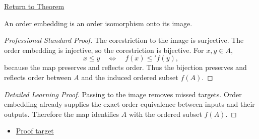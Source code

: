 \newpage
{}
\label{prf:order-embedding-isomorphism-onto-image}

\begin{remark*}[Return]
\hyperref[thm:order-embedding-isomorphism-onto-image]{Return to Theorem}
\end{remark*}

\begin{theorem*}
An order embedding is an order isomorphism onto its image.
\end{theorem*}

\begin{proof}[Professional Standard Proof]
\LRAProofBodyStart
The corestriction to the image is surjective. The order embedding is injective,
so the corestriction is bijective. For $x,y\in A$,
\[
x\leq y \quad\Longleftrightarrow\quad f(x)\leq' f(y),
\]
because the map preserves and reflects order. Thus the bijection preserves
and reflects order between $A$ and the induced ordered subset $f(A)$.
\end{proof}

\begin{proof}[Detailed Learning Proof]
\LRAProofBodyStart
Passing to the image removes missed targets. Order embedding already supplies
the exact order equivalence between inputs and their outputs. Therefore the
map identifies $A$ with the ordered subset $f(A)$.
\end{proof}
\begin{remark*}
\end{remark*}



\begin{dependencies}
\begin{itemize}
  \item \hyperref[thm:order-embedding-isomorphism-onto-image]{Proof target}
\end{itemize}
\end{dependencies}

\clearpage

